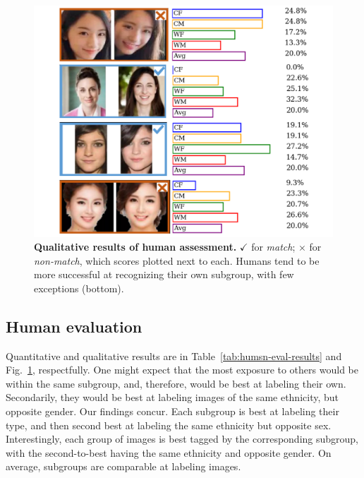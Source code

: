 \begin{figure}[t!] 
	\centering    
	\includegraphics[trim=0in 0.0in 0in 0in,clip, width=\linewidth] {images/human_eval.pdf}
		\caption{\small{\textbf{Qualitative results of human assessment.} $\checkmark$ for \emph{match}; $\times$ for \emph{non-match}, which scores plotted next to each. Humans tend to be more successful at recognizing their own subgroup, with few exceptions (bottom). }}
		\label{fig:human-eval} 
		\vspace{-5mm}
\end{figure} 

\subsection{Human evaluation}
 Quantitative and qualitative results are in Table~\ref{tab:humsn-eval-results} and Fig.~\ref{fig:human-eval}, respectfully. One might expect that the most exposure to others would be within the same subgroup, and, therefore, would be best at labeling their own. Secondarily, they would be best at labeling images of the same ethnicity, but opposite gender. Our findings concur. Each subgroup is best at labeling their type, and then second best at labeling the same ethnicity but opposite sex. Interestingly, each group of images is best tagged by the corresponding subgroup, with the second-to-best having the same ethnicity and opposite gender. On average, subgroups are comparable at labeling images. 



